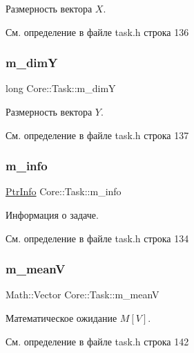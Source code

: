 Размерность вектора $X$. 

См. определение в файле task.\+h строка 136

\hypertarget{class_core_1_1_task_aa317bebd7f5dbfa5dc86463cb0377b12}{}\label{class_core_1_1_task_aa317bebd7f5dbfa5dc86463cb0377b12} 
\subsubsection{\texorpdfstring{m\+\_\+dimY}{m\_dimY}}
{\footnotesize\ttfamily long Core\+::\+Task\+::m\+\_\+dimY\hspace{0.3cm}{\ttfamily [protected]}}

Размерность вектора $Y$. 

См. определение в файле task.\+h строка 137

\hypertarget{class_core_1_1_task_a259973874ba0b34cd7faccfd35dd683f}{}\label{class_core_1_1_task_a259973874ba0b34cd7faccfd35dd683f} 
\subsubsection{\texorpdfstring{m\+\_\+info}{m\_info}}
{\footnotesize\ttfamily \hyperlink{namespace_core_a647483da8a1266d5bbd3e9bb5cd66d08}{Ptr\+Info} Core\+::\+Task\+::m\+\_\+info\hspace{0.3cm}{\ttfamily [protected]}}

Информация о задаче. 

См. определение в файле task.\+h строка 134

\hypertarget{class_core_1_1_task_a420e36c620e30cd0f55689ce481c1391}{}\label{class_core_1_1_task_a420e36c620e30cd0f55689ce481c1391} 
\subsubsection{\texorpdfstring{m\+\_\+meanV}{m\_meanV}}
{\footnotesize\ttfamily Math\+::\+Vector Core\+::\+Task\+::m\+\_\+meanV\hspace{0.3cm}{\ttfamily [protected]}}

Математическое ожидание $M[V]$. 

См. определение в файле task.\+h строка 142

